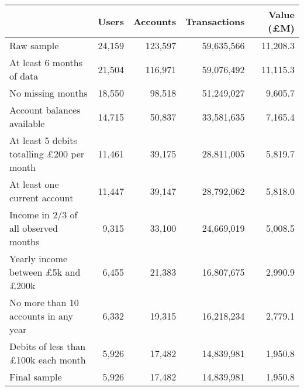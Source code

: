 \begin{tabular}{lrrrr}
\toprule
                                                 &  Users & Accounts & Transactions & Value (\pounds M) \\
\midrule
                                      Raw sample & 24,159 &  123,597 &   59,635,566 &          11,208.3 \\
                       At least 6 months of data & 21,504 &  116,971 &   59,076,492 &          11,115.3 \\
                               No missing months & 18,550 &   98,518 &   51,249,027 &           9,605.7 \\
                      Account balances available & 14,715 &   50,837 &   33,581,635 &           7,165.4 \\
At least 5 debits totalling \pounds200 per month & 11,461 &   39,175 &   28,811,005 &           5,819.7 \\
                    At least one current account & 11,447 &   39,147 &   28,792,062 &           5,818.0 \\
            Income in 2/3 of all observed months &  9,315 &   33,100 &   24,669,019 &           5,008.5 \\
 Yearly income between \pounds5k and \pounds200k &  6,455 &   21,383 &   16,807,675 &           2,990.9 \\
            No more than 10 accounts in any year &  6,332 &   19,315 &   16,218,234 &           2,779.1 \\
      Debits of less than \pounds100k each month &  5,926 &   17,482 &   14,839,981 &           1,950.8 \\
                                    Final sample &  5,926 &   17,482 &   14,839,981 &           1,950.8 \\
\bottomrule
\end{tabular}
